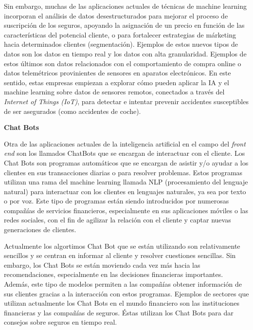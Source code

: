 \documentclass[]{DissertateUSU}
\begin{document}
\setlength\parskip{6ex}

\noindent Sin embargo, muchas de las aplicaciones actuales de técnicas
de machine learning incorporan el análisis de datos desestructurados
para mejorar el proceso de suscripción de los seguros, apoyando la
asignación de un precio en función de las características del potencial
cliente, o para fortalecer estrategias de márketing hacia determinados
clientes (segmentación). Ejemplos de estos nuevos tipos de datos son los
datos en tiempo real y los datos con alta granularidad. Ejemplos de
estos últimos son datos relacionados con el comportamiento de compra
online o datos telemétricos provinientes de sensores en aparatos
electrónicos. En este sentido, estas empresas empiezan a explorar cómo
pueden aplicar la IA y el machine learning sobre datos de sensores
remotos, conectados a través del \emph{Internet of Things (IoT)}, para
detectar e intentar prevenir accidentes susceptibles de ser asegurados
(como accidentes de coche).

\setlength\parskip{5ex}

\textbf{Chat Bots}

\noindent Otra de las aplicaciones actuales de la inteligencia
artificial en el campo del \emph{front end} son los llamados ChatBots
que se encargan de interactuar con el cliente. Los Chat Bots son
programas automáticos que se encargan de asistir y/o ayudar a los
clientes en sus transacciones diarias o para resolver problemas. Estos
programas utilizan una rama del machine learning llamada NLP
(procesamiento del lenguaje natural) para interactuar con los clientes
en lenguajes naturales, ya sea por texto o por voz. Este tipo de
programas están siendo introducidos por numerosas compañías de servicios
financieros, especialmente en sus aplicaciones móviles o las redes
sociales, con el fin de agilizar la relación con el cliente y captar
nuevas generaciones de clientes.

\noindent Actualmente los algortimos Chat Bot que se están utilizando
son relativamente sencillos y se centran en informar al cliente y
resolver cuestiones sencillas. Sin embargo, los Chat Bots se están
moviendo cada vez más hacia las recomendaciones, especialmente en las
decisiones financieras importantes. Además, este tipo de modelos
permiten a las compañías obtener información de sus clientes gracias a
la interacción con estos programas. Ejemplos de sectores que utilizan
actualmente los Chat Bots en el mundo financiero son las instituciones
financieras y las compañías de seguros. Éstas utilizan los Chat Bots
para dar consejos sobre seguros en tiempo real.
\end{document}
